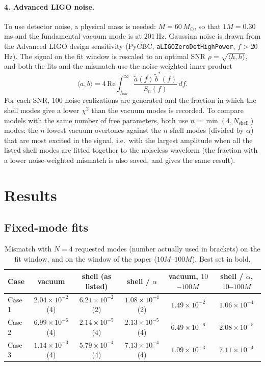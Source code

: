 \documentclass[11pt,a4paper]{article}
\begin{document}
\paragraph{4. Advanced LIGO noise.} To use detector noise, a physical mass is needed: $M=60\,M_\odot$, so that $1M=0.30$\,ms and the fundamental vacuum
mode is at $201$\,Hz. Gaussian noise is drawn from the Advanced LIGO
design sensitivity (PyCBC, \texttt{aLIGOZeroDetHighPower}, $f>20$\,Hz). The signal on the
fit window is rescaled to an optimal SNR $\rho=\sqrt{\langle h,h\rangle}$, and both the fits and the mismatch
use the noise-weighted inner product
\begin{equation}
\langle a,b\rangle=4\,\mathrm{Re}\int_{f_\mathrm{low}}^{\infty}\frac{\tilde a(f)\,\tilde b^*(f)}{S_n(f)}\,df .
\end{equation}
For each SNR, 100 noise realizations are generated and the fraction in which the shell
modes give a lower $\chi^2$ than the vacuum modes is recorded. To compare models with the same number of free
parameters, both use $n=\min(4,N_\mathrm{shell})$ modes: the $n$ lowest vacuum overtones against the $n$ shell
modes (divided by $\alpha$) that are most excited in the signal, i.e.\ with the largest amplitude when all the
listed shell modes are fitted together to the noiseless waveform (the fraction with a lower
noise-weighted mismatch is also saved, and gives the same result).

\section{Results}
\subsection{Fixed-mode fits}

\begin{table}[H]
\centering\small
\begin{tabular}{lccccc}
\toprule
Case & vacuum & shell (as listed) & shell / $\alpha$ & vacuum, $10$--$100M$ & shell / $\alpha$, $10$--$100M$ \\
\midrule
Case 1 & $2.04\times10^{-2}$ (4) & $6.21\times10^{-2}$ (2) & \textbf{$1.08\times10^{-4}$} (2) & $1.49\times10^{-2}$ & $1.06\times10^{-4}$ \\
Case 2 & \textbf{$6.99\times10^{-6}$} (4) & $2.14\times10^{-5}$ (4) & $2.13\times10^{-5}$ (4) & $6.49\times10^{-6}$ & $2.08\times10^{-5}$ \\
Case 3 & $1.14\times10^{-3}$ (4) & \textbf{$5.79\times10^{-4}$} (4) & $7.13\times10^{-4}$ (4) & $1.09\times10^{-3}$ & $7.11\times10^{-4}$ \\
\bottomrule
\end{tabular}
\caption{Mismatch with $N=4$ requested modes (number actually used in brackets) on the fit window, and on the window of the paper ($10M$--$100M$). Best set in bold.}
\end{table}
\end{document}
